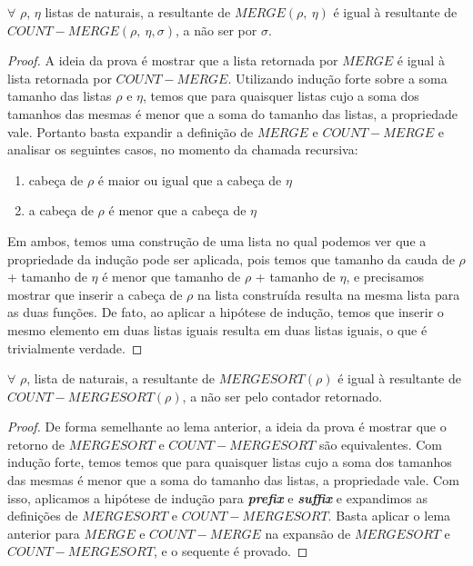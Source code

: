 \begin{lemma}
    \label{cmerge_equiv_merge}
    $\forall$ $\rho$, $\eta$ listas de naturais, a resultante de $MERGE(\rho,\ \eta)$
    é igual à resultante de $COUNT-MERGE(\rho,\ \eta, \sigma)$, a não ser por $\sigma$.
\end{lemma}

\begin{proof}
  A ideia da prova é mostrar que a lista retornada por $MERGE$ é 
  igual à lista retornada por $COUNT-MERGE$. Utilizando indução 
  forte sobre a soma tamanho das listas $\rho$ e $\eta$, 
  temos que para quaisquer listas cujo a soma dos tamanhos das mesmas
  é menor que a soma do tamanho das listas, a propriedade vale. Portanto
  basta expandir a definição de $MERGE$ e $COUNT-MERGE$ e analisar
  os seguintes casos, no momento da chamada recursiva:
    \begin{enumerate}
      \item cabeça de $\rho$ é maior ou igual que a cabeça de $\eta$
      \item a cabeça de $\rho$ é menor que a cabeça de $\eta$
    \end{enumerate}
  Em ambos, temos uma construção de uma lista no qual podemos ver que a 
  propriedade da indução pode ser aplicada, pois temos que tamanho da 
  cauda de $\rho$ + tamanho de $\eta$ é menor que tamanho de $\rho$ + tamanho
  de $\eta$, e precisamos mostrar que inserir a cabeça de $\rho$ na lista 
  construída resulta na mesma lista para as duas funções. De fato, ao aplicar
  a hipótese de indução, temos que inserir o mesmo elemento em duas listas iguais
  resulta em duas listas iguais, o que é trivialmente verdade.
\end{proof}

\begin{lemma}
  \label{cmergesort_equiv_mergesort}
  $\forall$ $\rho$, lista de naturais, a resultante de $MERGESORT(\rho)$
  é igual à resultante de $COUNT-MERGESORT(\rho)$, a não ser pelo contador retornado.
\end{lemma}

\begin{proof}
  De forma semelhante ao lema anterior, a ideia da prova é mostrar que o retorno
  de $MERGESORT$ e $COUNT-MERGESORT$ são equivalentes. Com indução forte, temos
  temos que para quaisquer listas cujo a soma dos tamanhos das mesmas é
  menor que a soma do tamanho das listas, a propriedade vale. Com isso, aplicamos
  a hipótese de indução para \textbf{\textit{prefix}} e \textbf{\textit{suffix}} e 
  expandimos as definições de $MERGESORT$ e $COUNT-MERGESORT$. Basta aplicar
  o lema anterior para $MERGE$ e $COUNT-MERGE$ na expansão de $MERGESORT$ e 
  $COUNT-MERGESORT$, e o sequente é provado.
\end{proof}

